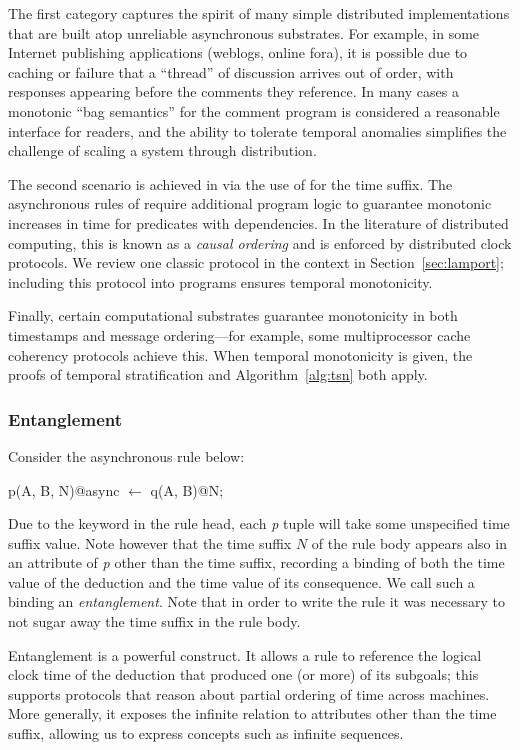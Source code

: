 The first category captures the spirit of many simple distributed implementations that are built atop unreliable asynchronous substrates.  For example, in some Internet publishing applications (weblogs, online fora), it is possible due to caching or failure that a ``thread'' of discussion arrives out of order, with responses appearing before the comments they reference.  In many cases a monotonic ``bag semantics'' for the comment program is considered a reasonable interface for readers, and the ability to tolerate temporal anomalies simplifies the challenge of scaling a system through distribution.

The second scenario is achieved in \slang via the use of  for the time suffix. The asynchronous rules of \lang require additional program logic to guarantee monotonic increases in time for predicates with dependencies.  In the literature of distributed computing, this is known as a {\em causal ordering} and is enforced by distributed clock protocols.  We review one classic protocol in the \lang context in Section~\ref{sec:lamport}; including this protocol into \lang programs ensures temporal monotonicity.

Finally, certain computational substrates guarantee monotonicity in both timestamps and message ordering---for example, some multiprocessor cache coherency protocols achieve this.  When temporal monotonicity is given, the proofs of temporal stratification and Algorithm~\ref{alg:tsn} both apply.

\subsubsection{Entanglement}
\label{sec:entangle}
Consider the asynchronous rule below:

\begin{Dedalus}
p(A, B, N)@async \(\leftarrow\)
  q(A, B)@N;
\end{Dedalus}
\noindent
Due to the  keyword in the rule head, each \emph{p} tuple will take some unspecified time suffix value.
Note however that the time suffix $N$ of the rule body appears also in an attribute of \emph{p} other than the time suffix, recording a 
binding of both the time value of the deduction and the time value of its consequence.  We call such a binding
an \emph{entanglement}.   Note that in order
to write the rule it was necessary to not sugar away the time suffix in the rule body.  

Entanglement is a powerful construct.  It allows a rule
to reference the logical clock time of the deduction that produced one
(or more) of its subgoals; this supports protocols that reason about partial ordering of time across machines.  More generally, it exposes the infinite  relation to attributes other than the time suffix, allowing us to express concepts such as infinite sequences.


